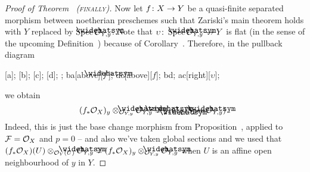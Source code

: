 \documentclass[a4paper,parskip=half,numbers=enddot, DIV=12]{scrreprt}
\begin{document}
\begin{proof}[Proof of Theorem~ \textsc{(finally)}]
Now let $f\colon X\morphism Y$ be a quasi-finite separated morphism between noetherian preschemes such that Zariski's main theorem holds with $Y$ replaced by $\Spec \roof{\Oo}_{Y,y}$. Note that $\upsilon\colon \Spec \roof{\Oo}_{Y,y}\morphism Y$ is flat (in the sense of the upcoming Definition~) because of Corollary~. Therefore, in the pullback diagram
\begin{diagram}
	;
	;
	;
	;
	;
	\scriptsize
	\arrow ba[above][$\roof{f}$];
	\arrow dc[above][$f$];
	\arrow bd;
	\arrow ac[right][$\upsilon$];
\end{diagram}
we obtain
\begin{align}\lbl{eq:froof*}
(f_*\Oo_X)_y\otimes_{\Oo_{Y,y}}\roof{\Oo}_{Y,y}\cong \roof{f}_*\Oo_{\roof{X}}(\Spec \roof{\Oo}_{Y,y})\;.
\end{align}
Indeed, this is just the base change morphism  from Proposition~, applied to $\mathcal{F}=\mathcal{O}_X$ and $p=0$ -- and also we've taken global sections and we used that $(f_*\Oo_X)(U)\otimes_{\Oo_Y(U)}\roof{\Oo}_{Y,y}\cong (f_*\Oo_X)_y\otimes_{\Oo_{Y,y}}\roof{\Oo}_{Y,y}$ when $U$ is an affine open neighbourhood of $y$ in $Y$.


\end{proof}
\end{document}
